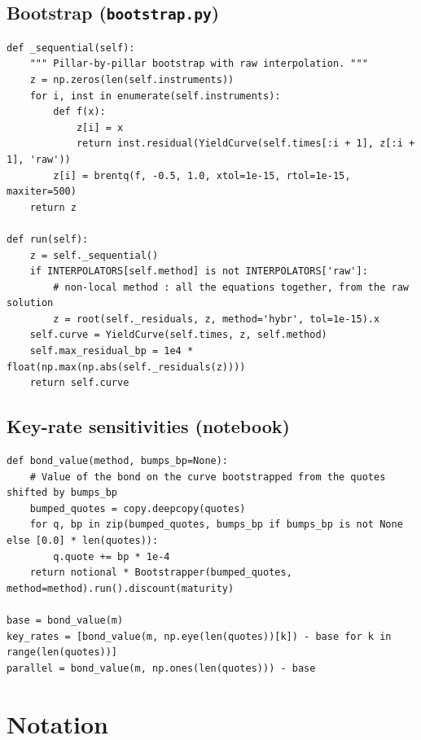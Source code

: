 \documentclass[11pt,a4paper]{article}
\theoremstyle{plain}
\theoremstyle{definition}
\begin{document}
\subsection{Bootstrap (\texttt{bootstrap.py})}
\begin{lstlisting}[style=pystyle]
def _sequential(self):
    """ Pillar-by-pillar bootstrap with raw interpolation. """
    z = np.zeros(len(self.instruments))
    for i, inst in enumerate(self.instruments):
        def f(x):
            z[i] = x
            return inst.residual(YieldCurve(self.times[:i + 1], z[:i + 1], 'raw'))
        z[i] = brentq(f, -0.5, 1.0, xtol=1e-15, rtol=1e-15, maxiter=500)
    return z

def run(self):
    z = self._sequential()
    if INTERPOLATORS[self.method] is not INTERPOLATORS['raw']:
        # non-local method : all the equations together, from the raw solution
        z = root(self._residuals, z, method='hybr', tol=1e-15).x
    self.curve = YieldCurve(self.times, z, self.method)
    self.max_residual_bp = 1e4 * float(np.max(np.abs(self._residuals(z))))
    return self.curve
\end{lstlisting}

\subsection{Key-rate sensitivities (notebook)}
\begin{lstlisting}[style=pystyle]
def bond_value(method, bumps_bp=None):
    # Value of the bond on the curve bootstrapped from the quotes shifted by bumps_bp
    bumped_quotes = copy.deepcopy(quotes)
    for q, bp in zip(bumped_quotes, bumps_bp if bumps_bp is not None else [0.0] * len(quotes)):
        q.quote += bp * 1e-4
    return notional * Bootstrapper(bumped_quotes, method=method).run().discount(maturity)

base = bond_value(m)
key_rates = [bond_value(m, np.eye(len(quotes))[k]) - base for k in range(len(quotes))]
parallel = bond_value(m, np.ones(len(quotes))) - base
\end{lstlisting}

\section{Notation}
\label{app:notation}
\end{document}
